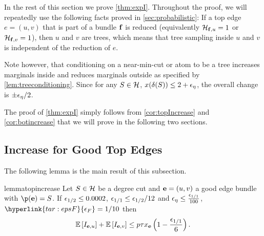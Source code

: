 In the rest of this section we prove \cref{thm:expI}.
Throughout the  proof, we will repeatedly use the following facts proved in \cref{sec:probabilistic}:
If a top edge $e = (u,v)$ that is part of a bundle ${\bf f}$ is reduced (equivalently $\mathcal{H}_{{\bf f},u}=1$ or $\mathcal{H}_{{\bf f},v}=1$), then $u$ and $v$ are trees, which means that tree sampling inside $u$ and $v$ is independent of the reduction of $e$. 

Note however, that conditioning on a near-min-cut or atom to be a tree increases marginals inside and reduces marginals outside as specified by \cref{lem:treeconditioning}. Since for any $S\in \mathcal{H}$, $x(\delta(S)) \le 2+{\epsilon}_\eta$, the overall change is $\pm {\epsilon}_\eta/2$. 
 

The proof of \cref{thm:expI} simply follows from  \cref{cor:topIncrease} and \cref{cor:botincrease} that we will prove in the following two sections.




\subsection{Increase for Good Top Edges}\label{sub:degcutincrease}
The following lemma is the main result of this subsection.
\begin{restatable}{lemma}{topincrease}
\label{cor:topIncrease}
Let $S\in\mathcal{H}$ be a degree cut and ${\bf e}=(u,v)$ a good edge bundle with $\p(\bbe)=S$.
If ${\epsilon}_{1/2}\leq 0.0002$, ${\epsilon}_{1/1}\leq {\epsilon}_{1/2}/12$ and ${\epsilon}_\eta\leq \frac{{\epsilon}_{1/1}}{100}$, $\hyperlink{tar:epsF}{\eps_F}=1/10$ then 
$${\mathbb{E}}\left[I_{{\bf e},u}\right]+ {\mathbb{E}}\left[I_{{\bf e},v}\right] \le p\tau x_{\bf e} \left(1 -\frac{{\epsilon}_{1/1}}{6}\right).$$
\end{restatable} 

